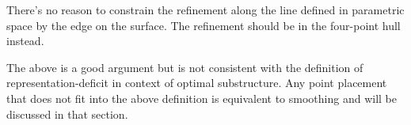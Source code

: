 There's no reason to constrain the refinement along the line defined in parametric space by the edge on the surface. The refinement should be in the four-point hull instead.

The above is a good argument but is not consistent with the definition of representation-deficit in context of optimal substructure. Any point placement that does not fit into the above definition is equivalent to smoothing and will be discussed in that section.
